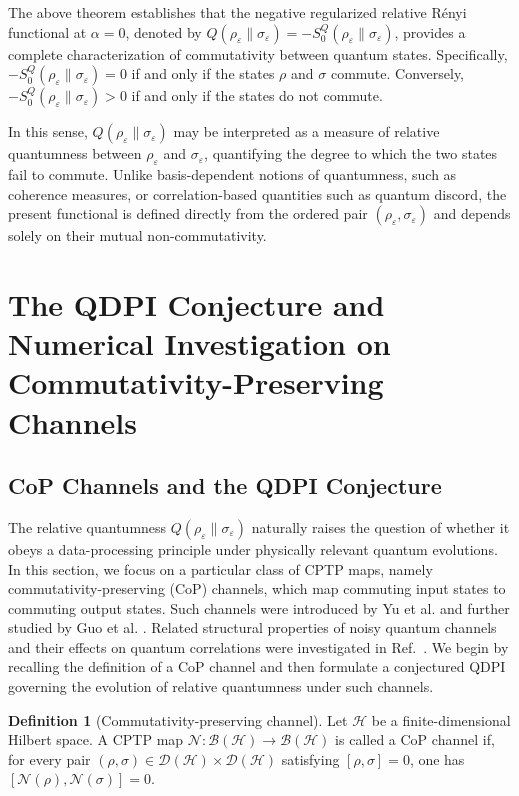 \documentclass[a4paper, amsfonts, amssymb, amsmath, reprint, showkeys, nofootinbib, twoside, aps, pra]{revtex4-2}
\theoremstyle{definition}
\newtheorem{definition}{Definition}
\begin{document}
The above theorem establishes that the negative regularized relative Rényi functional at $\alpha=0$, denoted by $Q(\rho_\varepsilon\|\sigma_\varepsilon) =-S_0^Q(\rho_\varepsilon\|\sigma_\varepsilon)$, provides a complete characterization of commutativity between quantum states. Specifically, $-S_0^Q(\rho_\varepsilon\|\sigma_\varepsilon) = 0$ if and only if the states $\rho$ and $\sigma$ commute.  Conversely, $-S_0^Q(\rho_\varepsilon\|\sigma_\varepsilon) > 0$ if and only if the states do not commute.

In this sense, $Q(\rho_\varepsilon\|\sigma_\varepsilon)$ may be interpreted as a measure of relative quantumness between $\rho_\varepsilon$ and $\sigma_\varepsilon$, quantifying the degree to which the two states fail to commute. Unlike basis-dependent notions of quantumness, such as coherence measures, or correlation-based quantities such as quantum discord, the present functional is defined directly from the ordered pair $(\rho_\varepsilon,\sigma_\varepsilon)$
and depends solely on their mutual non-commutativity.


\section{The QDPI Conjecture and Numerical Investigation on Commutativity-Preserving Channels}\label{CoP-QDPI}

\subsection{CoP Channels and the QDPI Conjecture}
The relative quantumness $Q(\rho_\varepsilon\|\sigma_\varepsilon)$
naturally raises the question of whether it obeys a data-processing principle under physically relevant quantum evolutions.
In this section, we focus on a particular class of CPTP maps, namely commutativity-preserving (CoP) channels, which map
commuting input states to commuting output states. Such channels were introduced by Yu et al. \cite{Yu2011} and further studied by Guo et al. \cite{Guo_2013}. Related structural properties of noisy quantum channels and their effects on quantum correlations were investigated in Ref.~\cite{Streltsov2011}. We begin by recalling the definition of a CoP channel and then formulate a conjectured QDPI governing the evolution of relative quantumness under such channels.


\begin{definition}[Commutativity-preserving channel]\label{def:comm-preserving}
Let $\mathcal{H}$ be a finite-dimensional Hilbert space. A CPTP map $\mathcal{N}:\mathcal{B}(\mathcal{H})\to\mathcal{B}(\mathcal{H})$ is called a CoP channel if, for every
pair $(\rho,\sigma)\in\mathcal{D}(\mathcal{H})\times
\mathcal{D}(\mathcal{H})$ satisfying $[\rho,\sigma]=0$, one has $[\mathcal {N}(\rho),\mathcal {N}(\sigma)]=0$.
\end{definition}
\end{document}

